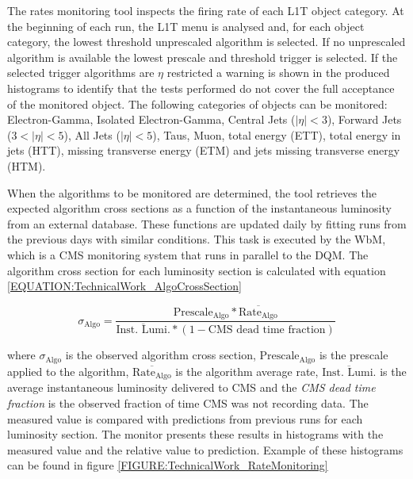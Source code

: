 
The rates monitoring tool inspects the firing rate of each \gls{L1T} object category. At the beginning of each run, the \gls{L1T} menu is analysed and, for each object category, the lowest threshold unprescaled algorithm is selected. If no unprescaled algorithm is available the lowest prescale and threshold trigger is selected. If the selected trigger algorithms are $\eta$ restricted a warning is shown in the produced histograms to identify that the tests performed do not cover the full acceptance of the monitored object. The following categories of objects can be monitored: Electron-Gamma, Isolated Electron-Gamma, Central Jets ($|\eta|<3$), Forward Jets ($3<|\eta|<5$), All Jets ($|\eta|<5$), Taus, Muon, total energy (ETT), total energy in jets (HTT), missing transverse energy (ETM) and jets missing transverse energy (HTM).

When the algorithms to be monitored are determined, the tool retrieves the expected algorithm cross sections as a function of the instantaneous luminosity from an external database. These functions are updated daily by fitting runs from the previous days with similar conditions. This task is executed by the \gls{WbM}, which is a \gls{CMS} monitoring system that runs in parallel to the \gls{DQM}. The algorithm cross section for each luminosity section is calculated with equation \ref{EQUATION:TechnicalWork_AlgoCrossSection}

\begin{equation}
\sigma_{\text{Algo}}=\frac{\text{Prescale}_{\text{Algo}}*{\overline{\text{Rate}_{\text{Algo}}}}}{\overline{\text{Inst. Lumi.}}*(1-\text{CMS dead time fraction})}
\label{EQUATION:TechnicalWork_AlgoCrossSection}
\end{equation}

where $\sigma_{\text{Algo}}$ is the observed algorithm cross section, $\text{Prescale}_{\text{Algo}}$ is the prescale applied to the algorithm, $\overline{\text{Rate}_{\text{Algo}}}$ is the algorithm average rate, $\overline{\text{Inst. Lumi.}}$ is the average instantaneous luminosity delivered to \gls{CMS} and the \textit{CMS dead time fraction} is the observed fraction of time \gls{CMS} was not recording data. The measured value is compared with predictions from previous runs for each luminosity section. The monitor presents these results in histograms with the measured value and the relative value to prediction. Example of these histograms can be found in figure \ref{FIGURE:TechnicalWork_RateMonitoring}


